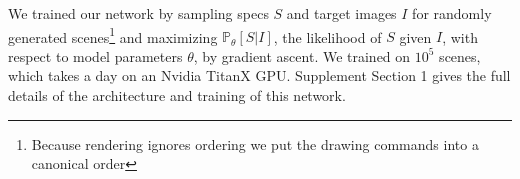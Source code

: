 \documentclass{article}
\newcommand{\probability}{\mathds{P}} %
\theoremstyle{definition}
\begin{document}
We trained our network by sampling specs $S$ and target
images $I$ for randomly generated scenes\footnote{Because rendering ignores ordering  we put the drawing commands into a canonical order}
and maximizing $\probability_\theta[S|I]$,
 the likelihood of $S$ given $I$, with respect to
  model parameters $\theta$, by gradient ascent.
We trained on $10^5$ scenes, which takes a day on an Nvidia TitanX GPU.
Supplement Section 1 gives the full details of the architecture and training of this network.
\end{document}

